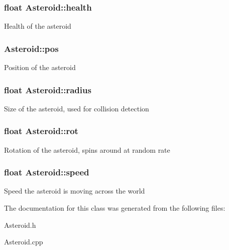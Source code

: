 \subsubsection[{\texorpdfstring{health}{health}}]{\setlength{\rightskip}{0pt plus 5cm}float Asteroid\+::health\hspace{0.3cm}{\ttfamily [private]}}\hypertarget{class_asteroid_a381a4221420bf9ba5173fa2b1e3e8725}{}\label{class_asteroid_a381a4221420bf9ba5173fa2b1e3e8725}
Health of the asteroid 
\subsubsection[{\texorpdfstring{pos}{pos}}]{ Asteroid\+::pos\hspace{0.3cm}{\ttfamily [private]}}\hypertarget{class_asteroid_a904f545cbd4987ad462fe823ec354893}{}\label{class_asteroid_a904f545cbd4987ad462fe823ec354893}
Position of the asteroid 
\subsubsection[{\texorpdfstring{radius}{radius}}]{\setlength{\rightskip}{0pt plus 5cm}float Asteroid\+::radius\hspace{0.3cm}{\ttfamily [private]}}\hypertarget{class_asteroid_adab1cde40d42ab75226228bab7f29141}{}\label{class_asteroid_adab1cde40d42ab75226228bab7f29141}
Size of the asteroid, used for collision detection 
\subsubsection[{\texorpdfstring{rot}{rot}}]{\setlength{\rightskip}{0pt plus 5cm}float Asteroid\+::rot\hspace{0.3cm}{\ttfamily [private]}}\hypertarget{class_asteroid_aee0c41aeafc6f3d1ae4fad8a1010a06b}{}\label{class_asteroid_aee0c41aeafc6f3d1ae4fad8a1010a06b}
Rotation of the asteroid, spins around at random rate 
\subsubsection[{\texorpdfstring{speed}{speed}}]{\setlength{\rightskip}{0pt plus 5cm}float Asteroid\+::speed\hspace{0.3cm}{\ttfamily [private]}}\hypertarget{class_asteroid_a8288705d515d1504e5e0966dfa8cdf2e}{}\label{class_asteroid_a8288705d515d1504e5e0966dfa8cdf2e}
Speed the asteroid is moving across the world 

The documentation for this class was generated from the following files\+:\begin{DoxyCompactItemize}
\item 
Asteroid.\+h\item 
Asteroid.\+cpp\end{DoxyCompactItemize}
